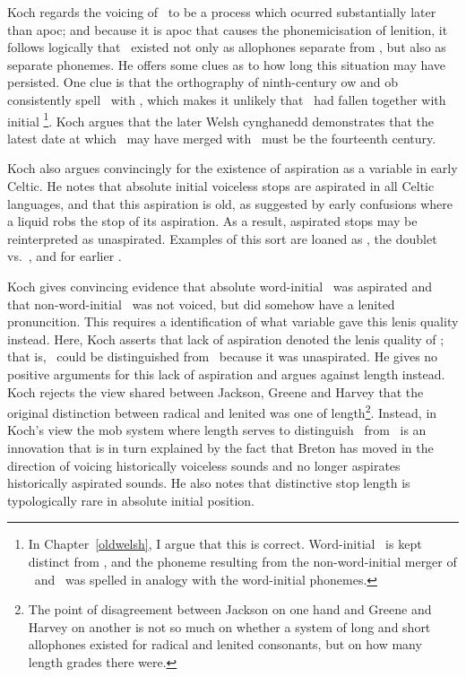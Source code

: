 Koch regards the voicing of \lT\ to be a process which ocurred substantially later than \gls{apoc}; and because it is \gls{apoc} that causes the phonemicisation of lenition, it follows logically that \lT\ existed not only as allophones separate from \xD, but also as separate phonemes. He offers some clues as to how long this situation may have persisted. One clue is that the orthography of ninth-century \gls{ow} and \gls{ob} consistently spell \lT\ with , which makes it unlikely that \lT\ had fallen together with initial \xD\footnote{In Chapter~\ref{oldwelsh}, I argue that this is correct. Word-initial \lT\ is kept distinct from \xD, and the phoneme resulting from the non-word-initial merger of \lT\ and \xD\ was spelled in analogy with the word-initial phonemes.}. Koch argues that the later Welsh cynghanedd demonstrates that the latest date at which \lT\ may have merged with \xD\ must be the fourteenth century. 

Koch also argues convincingly for the existence of aspiration as a variable in early Celtic. He notes that absolute initial voiceless stops are aspirated in all Celtic languages, and that this aspiration is old, as suggested by early confusions where a liquid robs the stop of its aspiration. As a result, aspirated stops may be reinterpreted as unaspirated. Examples of this sort are   loaned as , the doublet  vs.~, and  for earlier .

Koch gives convincing evidence that absolute word-initial \xT\ was aspirated and that non-word-initial \lT\ was not voiced, but did somehow have a lenited pronuncition. This requires a identification of what variable gave  this lenis quality instead. Here, Koch asserts that lack of aspiration denoted the lenis quality of \lT; that is, \lT\ could be distinguished from \xT\ because it was unaspirated. He gives no positive arguments for this lack of aspiration and argues against length instead. Koch rejects the view shared between Jackson, Greene and Harvey that the original distinction between radical and lenited was one of length\footnote{The point of disagreement between Jackson on one hand and Greene and Harvey on another is not so much on whether a system of long and short allophones existed for radical and lenited consonants, but on how many length grades there were.}. Instead, in Koch's view the \gls{mob} system where length serves to distinguish \lT\ from \xD\ is an innovation that is in turn  explained by the fact that Breton has moved in the direction of voicing historically voiceless sounds and no longer aspirates historically aspirated sounds. He also notes that distinctive stop length is typologically rare in absolute initial position. 

